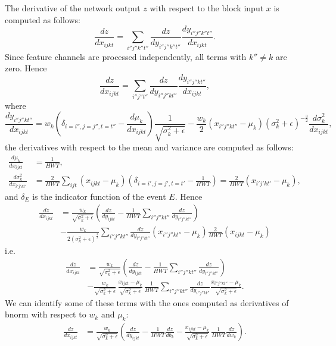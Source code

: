 The derivative of the network output $z$ with respect to the block input $x$ is computed as follows:
\[
\frac{dz}{dx_{ijkt}} = \sum_{i''j''k''t''}
\frac{dz}{d y_{i''j''k''t''}} 
\frac{d y_{i''j''k''t''}}{d x_{ijkt}}.
\]
Since feature channels are processed independently, all terms with $k''\not=k$ are zero. Hence
\[
\frac{dz}{dx_{ijkt}} = \sum_{i''j''t''}
\frac{dz}{d y_{i''j''kt''}} 
\frac{d y_{i''j''kt''}}{d x_{ijkt}},
\]
where
\[
\frac{d y_{i''j''kt''}}{d x_{ijkt}} 
=
w_k
\left(\delta_{i=i'',j=j'',t=t''} - \frac{d \mu_k}{d x_{ijkt}}\right)
\frac{1}{\sqrt{\sigma^2_k + \epsilon}}
-
\frac{w_k}{2}
\left(x_{i''j''kt''} - \mu_k\right)
\left(\sigma_k^2 + \epsilon \right)^{-\frac{3}{2}}
\frac{d \sigma_k^2}{d x_{ijkt}},
\]
the derivatives with respect to the mean and variance are computed as follows:
\begin{align*}
\frac{d \mu_k}{d x_{ijkt}} &= \frac{1}{HWT},
\\
\frac{d \sigma_k^2}{d x_{i'j'kt'}}
&=
\frac{2}{HWT}
\sum_{ijt}
\left(x_{ijkt} - \mu_k \right)
\left(\delta_{i=i',j=j',t=t'} - \frac{1}{HWT} \right)
=
\frac{2}{HWT} \left(x_{i'j'kt'} - \mu_k \right),
\end{align*}
and $\delta_E$ is the indicator function of the event $E$. Hence
\begin{align*}
\frac{dz}{dx_{ijkt}}
&=
\frac{w_k}{\sqrt{\sigma^2_k + \epsilon}}
\left(
\frac{dz}{d y_{ijkt}} 
-
\frac{1}{HWT}\sum_{i''j''kt''}
\frac{dz}{d y_{i''j''kt''}} 
\right)
\\
&-
\frac{w_k}{2(\sigma^2_k + \epsilon)^{\frac{3}{2}}}
\sum_{i''j''kt''}
\frac{dz}{d y_{i''j''kt''}} 
\left(x_{i''j''kt''} - \mu_k\right)
\frac{2}{HWT} \left(x_{ijkt} - \mu_k \right)
\end{align*}
i.e.
\begin{align*}
\frac{dz}{dx_{ijkt}}
&=
\frac{w_k}{\sqrt{\sigma^2_k + \epsilon}}
\left(
\frac{dz}{d y_{ijkt}} 
-
\frac{1}{HWT}\sum_{i''j''kt''}
\frac{dz}{d y_{i''j''kt''}} 
\right)
\\
&-
\frac{w_k}{\sqrt{\sigma^2_k + \epsilon}}
\,
\frac{x_{ijkt} - \mu_k}{\sqrt{\sigma^2_k + \epsilon}}
\,
\frac{1}{HWT}
\sum_{i''j''kt''}
\frac{dz}{d y_{i''j''kt''}} 
\frac{x_{i''j''kt''} - \mu_k}{\sqrt{\sigma^2_k + \epsilon}}.
\end{align*}
We can identify some of these terms with the ones computed as derivatives of bnorm with respect to $w_k$ and $\mu_k$:
\begin{align*}
\frac{dz}{dx_{ijkt}}
&=
\frac{w_k}{\sqrt{\sigma^2_k + \epsilon}}
\left(
\frac{dz}{d y_{ijkt}} 
-
\frac{1}{HWT}
\frac{dz}{d b_k} 
-
\frac{x_{ijkt} - \mu_k}{\sqrt{\sigma^2_k + \epsilon}}
\,
\frac{1}{HWT}
\frac{dz}{dw_k}
\right).
\end{align*}

